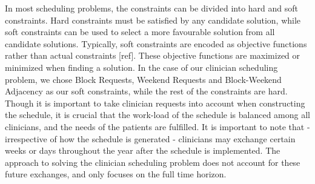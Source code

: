 In most scheduling problems, the constraints can be divided into hard and soft constraints. Hard constraints must be satisfied by any candidate solution, while soft constraints can be used to select a more favourable solution from all candidate solutions. Typically, soft constraints are encoded as objective functions rather than actual constraints [ref]. These objective functions are maximized or minimized when finding a solution. In the case of our clinician scheduling problem, we chose Block Requests, Weekend Requests and Block-Weekend Adjacency as our soft constraints, while the rest of the constraints are hard. Though it is important to take clinician requests into account when constructing the schedule, it is crucial that the work-load of the schedule is balanced among all clinicians, and the needs of the patients are fulfilled. It is important to note that - irrespective of how the schedule is generated - clinicians may exchange certain weeks or days throughout the year after the schedule is implemented. The approach to solving the clinician scheduling problem does not account for these future exchanges, and only focuses on the full time horizon.
